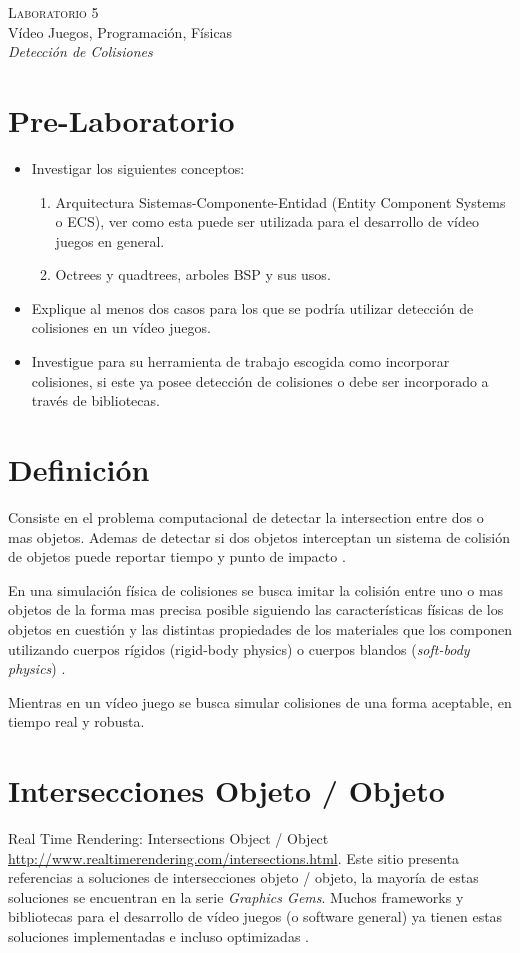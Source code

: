 \begin{center}
\textsc{\Large Laboratorio 5}~\\
{\large Vídeo Juegos, Programación, Físicas}~\\
\emph{Detección de Colisiones}
\end{center}


\section{Pre-Laboratorio}
\begin{itemize}
\item Investigar los siguientes conceptos:
\begin{enumerate}
  \item Arquitectura Sistemas-Componente-Entidad (Entity Component Systems o ECS), ver como esta puede ser utilizada para el desarrollo de vídeo juegos en general.
  \item Octrees y quadtrees, arboles BSP y sus usos.
\end{enumerate}
\item Explique al menos dos casos para los que se podría utilizar detección de colisiones en un vídeo juegos.
\item Investigue para su herramienta de trabajo escogida como incorporar colisiones, si este ya posee detección de colisiones o debe ser incorporado a través de bibliotecas.
\end{itemize}

\section{Definición}
Consiste en el problema computacional de detectar la intersection entre dos o mas objetos. Ademas de detectar si dos objetos interceptan un sistema de colisión de objetos puede reportar tiempo y punto de impacto \cite{ericson_collision}.

En una simulación física de colisiones se busca imitar la colisión entre uno o mas objetos de la forma mas precisa posible siguiendo las características físicas de los objetos en cuestión y las distintas propiedades de los materiales que los componen utilizando cuerpos rígidos (rigid-body physics) o cuerpos blandos (\emph{soft-body physics}) \cite[p.~340]{jenkinscreatinggames}.

Mientras en un vídeo juego se busca simular colisiones de una forma aceptable, en tiempo real y robusta.

\section{Intersecciones Objeto / Objeto}
Real Time Rendering: Intersections Object / Object \url{http://www.realtimerendering.com/intersections.html}. Este sitio presenta referencias a soluciones de intersecciones objeto / objeto, la mayoría de estas soluciones se encuentran en la serie \emph{Graphics Gems}. Muchos frameworks y bibliotecas para el desarrollo de vídeo juegos (o software general) ya tienen estas soluciones implementadas e incluso optimizadas \cite{rtr_intersections}.
